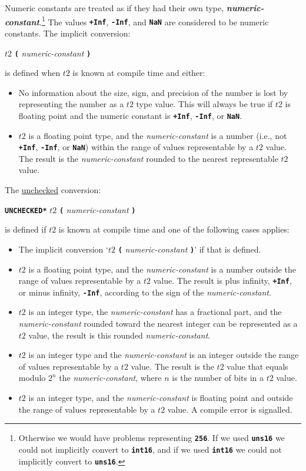 \documentclass[12pt]{article}
\newcommand{\TT}[1]{{\tt \bfseries #1}}
\newcommand{\key}[1]{{\bf \em #1}\index{#1}}
\begin{document}
Numeric constants are treated as if they had their own type,
\key{numeric-constant}.\footnote{Otherwise we would have problems
representing \TT{256}.  If we used \TT{uns16} we could not implicitly
convert to \TT{int16}, and if we used \TT{int16} we could not implicitly
convert to \TT{uns16}.}  The values \TT{+Inf}, \TT{-Inf}, and \TT{NaN}
are considered to be numeric constants.
The implicit conversion:
\begin{center}
$t2$ \TT{(} {\em numeric-constant} \TT{)}
\end{center}
is defined when $t2$ is known at compile time and either:
\begin{itemize}
\item No information about the size, sign, and
precision of the number is lost by representing the number
as a $t2$ type value.  This will always be true if $t2$ is
floating point and the numeric constant is \TT{+Inf}, \TT{-Inf},
or \TT{NaN}.
\item $t2$ is a floating point type,
and the {\em numeric-constant} is a number (i.e., not
\TT{+Inf}, \TT{-Inf}, or \TT{NaN})
within the range of values representable
by a $t2$ value.  The result is the {\em numeric-constant} rounded to
the nearest representable $t2$ value.
\end{itemize}

The \underline{unchecked} conversion:
\begin{center}
\TT{*UNCHECKED*} $t2$ \TT{(} {\em numeric-constant} \TT{)}
\end{center}
is defined if $t2$ is known at compile time
and one of the following cases applies:
\begin{itemize}
\item The implicit conversion `$t2$ \TT{(} {\em numeric-constant} \TT{)}'
if that is defined.
\item $t2$ is a floating point type,
and the {\em numeric-constant} is a number
outside the range of values representable
by a $t2$ value.
The result is plus infinity, \TT{+Inf}, or minus infinity, \TT{-Inf},
according to the sign of the {\em numeric-constant}.
\item $t2$ is an integer type, the {\em numeric-constant}
has a fractional part, and
the {\em numeric-constant} rounded toward the nearest integer
can be represented as a $t2$ value,
the result is this rounded {\em numeric-constant}.
\item $t2$ is an integer type
and the {\em numeric-constant} is an integer
outside the range of values representable
by a $t2$ value.
The result is the $t2$ value that
equals modulo $2^n$ the {\em numeric-constant}, where $n$ is the
number of bits in a $t2$ value.
\item $t2$ is an integer type,
and the {\em numeric-constant} is floating point and
outside the range of values representable
by a $t2$ value.
A compile error is signalled.
\end{itemize}
\end{document}
